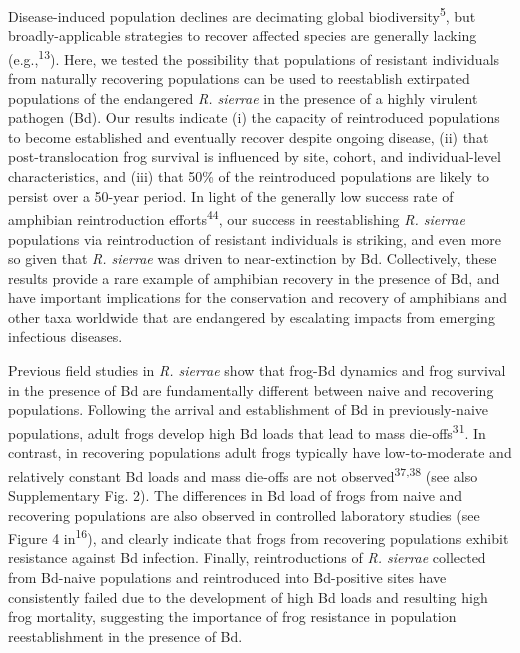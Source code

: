 \documentclass[
  letterpaper,
  DIV=11,
  numbers=noendperiod]{scrartcl}
\begin{document}
Disease-induced population declines are decimating global
biodiversity\textsuperscript{5}, but broadly-applicable strategies to
recover affected species are generally lacking
(e.g.,\textsuperscript{13}). Here, we tested the possibility that
populations of resistant individuals from naturally recovering
populations can be used to reestablish extirpated populations of the
endangered \emph{R. sierrae} in the presence of a highly virulent
pathogen (Bd). Our results indicate (i) the capacity of reintroduced
populations to become established and eventually recover despite ongoing
disease, (ii) that post-translocation frog survival is influenced by
site, cohort, and individual-level characteristics, and (iii) that 50\%
of the reintroduced populations are likely to persist over a 50-year
period. In light of the generally low success rate of amphibian
reintroduction efforts\textsuperscript{44}, our success in
reestablishing \emph{R. sierrae} populations via reintroduction of
resistant individuals is striking, and even more so given that \emph{R.
sierrae} was driven to near-extinction by Bd. Collectively, these
results provide a rare example of amphibian recovery in the presence of
Bd, and have important implications for the conservation and recovery of
amphibians and other taxa worldwide that are endangered by escalating
impacts from emerging infectious diseases.

Previous field studies in \emph{R. sierrae} show that frog-Bd dynamics
and frog survival in the presence of Bd are fundamentally different
between naive and recovering populations. Following the arrival and
establishment of Bd in previously-naive populations, adult frogs develop
high Bd loads that lead to mass die-offs\textsuperscript{31}. In
contrast, in recovering populations adult frogs typically have
low-to-moderate and relatively constant Bd loads and mass die-offs are
not observed\textsuperscript{37,38} (see also Supplementary Fig. 2). The
differences in Bd load of frogs from naive and recovering populations
are also observed in controlled laboratory studies (see Figure 4
in\textsuperscript{16}), and clearly indicate that frogs from recovering
populations exhibit resistance against Bd infection. Finally,
reintroductions of \emph{R. sierrae} collected from Bd-naive populations
and reintroduced into Bd-positive sites have consistently failed due to
the development of high Bd loads and resulting high frog mortality,
suggesting the importance of frog resistance in population
reestablishment in the presence of Bd.
\end{document}
